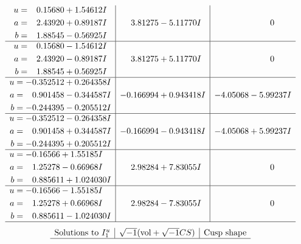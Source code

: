 \documentclass[1p]{elsarticle_modified}
\theoremstyle{definition}
\newcommand{\I}{\sqrt{-1}}
\begin{document}
$$\begin{array}{c|c|c}
\begin{aligned}
u &= \phantom{-}0.15680 + 1.54612 I \\
a &= \phantom{-}2.43920 + 0.89187 I \\
b &= \phantom{-}1.88545 - 0.56925 I\end{aligned}
 & \phantom{-}3.81275 - 5.11770 I & \phantom{-0.000000 } 0 \\ \hline\begin{aligned}
u &= \phantom{-}0.15680 - 1.54612 I \\
a &= \phantom{-}2.43920 - 0.89187 I \\
b &= \phantom{-}1.88545 + 0.56925 I\end{aligned}
 & \phantom{-}3.81275 + 5.11770 I & \phantom{-0.000000 } 0 \\ \hline\begin{aligned}
u &= -0.352512 + 0.264358 I \\
a &= \phantom{-}0.901458 - 0.344587 I \\
b &= -0.244395 - 0.205512 I\end{aligned}
 & -0.166994 + 0.943418 I & -4.05068 - 5.99237 I \\ \hline\begin{aligned}
u &= -0.352512 - 0.264358 I \\
a &= \phantom{-}0.901458 + 0.344587 I \\
b &= -0.244395 + 0.205512 I\end{aligned}
 & -0.166994 - 0.943418 I & -4.05068 + 5.99237 I \\ \hline\begin{aligned}
u &= -0.16566 + 1.55185 I \\
a &= \phantom{-}1.25278 - 0.66968 I \\
b &= \phantom{-}0.885611 + 1.024030 I\end{aligned}
 & \phantom{-}2.98284 + 7.83055 I & \phantom{-0.000000 } 0 \\ \hline\begin{aligned}
u &= -0.16566 - 1.55185 I \\
a &= \phantom{-}1.25278 + 0.66968 I \\
b &= \phantom{-}0.885611 - 1.024030 I\end{aligned}
 & \phantom{-}2.98284 - 7.83055 I & \phantom{-0.000000 } 0\\
 \hline 
 \end{array}$$\newpage$$\begin{array}{c|c|c}  
\text{Solutions to }I^u_{1}& \I (\text{vol} + \sqrt{-1}CS) & \text{Cusp shape}\\
 \hline 

\end{array}$$
\end{document}
